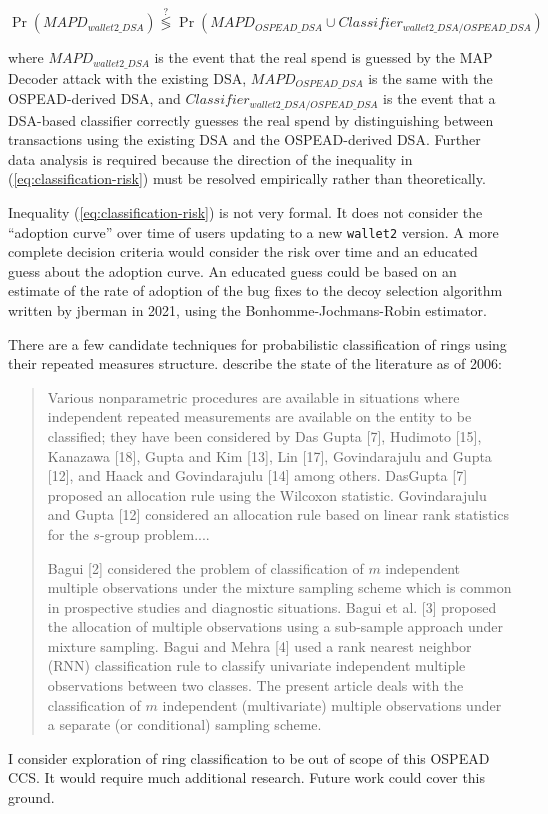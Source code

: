 \documentclass[english]{article}
\begin{document}
\begin{equation}
\Pr\left(MAPD_{wallet2\_DSA}\right)\overset{?}{\lessgtr}\Pr\left(MAPD_{OSPEAD\_DSA}\cup Classifier_{wallet2\_DSA/OSPEAD\_DSA}\right)\label{eq:classification-risk}
\end{equation}

where $MAPD_{wallet2\_DSA}$ is the event that the real spend is guessed
by the MAP Decoder attack with the existing DSA, $MAPD_{OSPEAD\_DSA}$
is the same with the OSPEAD-derived DSA, and $Classifier_{wallet2\_DSA/OSPEAD\_DSA}$
is the event that a DSA-based classifier correctly guesses the real
spend by distinguishing between transactions using the existing DSA
and the OSPEAD-derived DSA. Further data analysis is required because
the direction of the inequality in (\ref{eq:classification-risk})
must be resolved empirically rather than theoretically.

Inequality (\ref{eq:classification-risk}) is not very formal. It
does not consider the ``adoption curve'' over time of users updating
to a new \texttt{wallet2} version. A more complete decision criteria
would consider the risk over time and an educated guess about the
adoption curve. An educated guess could be based on an estimate of
the rate of adoption of the bug fixes to the decoy selection algorithm
written by jberman in 2021, using the Bonhomme-Jochmans-Robin estimator.

There are a few candidate techniques for probabilistic classification
of rings using their repeated measures structure. \cite{Bagui2006}
describe the state of the literature as of 2006:
\begin{quote}
Various nonparametric procedures are available in situations where
independent repeated measurements are available on the entity to be
classified; they have been considered by Das Gupta {[}7{]}, Hudimoto
{[}15{]}, Kanazawa {[}18{]}, Gupta and Kim {[}13{]}, Lin {[}17{]},
Govindarajulu and Gupta {[}12{]}, and Haack and Govindarajulu {[}14{]}
among others. DasGupta {[}7{]} proposed an allocation rule using the
Wilcoxon statistic. Govindarajulu and Gupta {[}12{]} considered an
allocation rule based on linear rank statistics for the $s$-group
problem....

Bagui {[}2{]} considered the problem of classification of $m$ independent
multiple observations under the mixture sampling scheme which is common
in prospective studies and diagnostic situations. Bagui et al. {[}3{]}
proposed the allocation of multiple observations using a sub-sample
approach under mixture sampling. Bagui and Mehra {[}4{]} used a rank
nearest neighbor (RNN) classification rule to classify univariate
independent multiple observations between two classes. The present
article deals with the classification of $m$ independent (multivariate)
multiple observations under a separate (or conditional) sampling scheme.
\end{quote}
I consider exploration of ring classification to be out of scope of
this OSPEAD CCS. It would require much additional research. Future
work could cover this ground.
\end{document}
